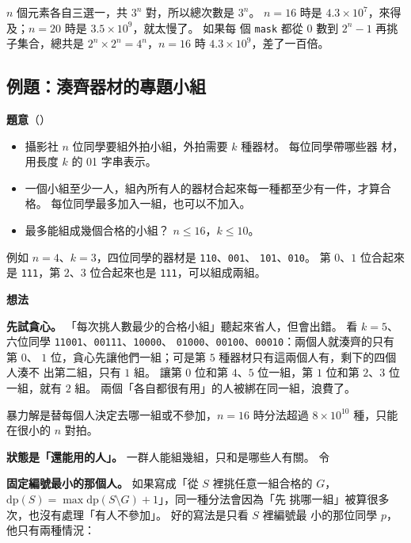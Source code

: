 $n$ 個元素各自三選一，共 $3^n$ 對，所以總次數是 $3^n$。 $n = 16$ 時是
$4.3 \times 10^7$，來得及；$n = 20$ 時是 $3.5 \times 10^9$，就太慢了。 如果每
個 \texttt{mask} 都從 $0$ 數到 $2^n - 1$ 再挑子集合，總共是
$2^n \times 2^n = 4^n$，$n = 16$ 時 $4.3 \times 10^9$，差了一百倍。

\subsection{例題：湊齊器材的專題小組}
\label{sec:ex-bm-kit}

\textbf{題意}（）

\begin{itemize}
\item 攝影社 $n$ 位同學要組外拍小組，外拍需要 $k$ 種器材。 每位同學帶哪些器
材，用長度 $k$ 的 01 字串表示。
\item 一個小組至少一人，組內所有人的器材合起來每一種都至少有一件，才算合格。
每位同學最多加入一組，也可以不加入。
\item 最多能組成幾個合格的小組？ $n \le 16$，$k \le 10$。
\end{itemize}

例如 $n = 4$、$k = 3$，四位同學的器材是 \texttt{110}、\texttt{001}、
\texttt{101}、\texttt{010}。 第 $0$、$1$ 位合起來是 \texttt{111}，第 $2$、$3$
位合起來也是 \texttt{111}，可以組成兩組。

\textbf{想法}

\textbf{先試貪心。} 「每次挑人數最少的合格小組」聽起來省人，但會出錯。 看
$k = 5$、六位同學 \texttt{11001}、\texttt{00111}、\texttt{10000}、
\texttt{01000}、\texttt{00100}、\texttt{00010}：兩個人就湊齊的只有第 $0$、
$1$ 位，貪心先讓他們一組；可是第 $5$ 種器材只有這兩個人有，剩下的四個人湊不
出第二組，只有 $1$ 組。 讓第 $0$ 位和第 $4$、$5$ 位一組，第 $1$ 位和第
$2$、$3$ 位一組，就有 $2$ 組。 兩個「各自都很有用」的人被綁在同一組，浪費了。

暴力解是替每個人決定去哪一組或不參加，$n = 16$ 時分法超過 $8 \times 10^{10}$
種，只能在很小的 $n$ 對拍。

\textbf{狀態是「還能用的人」。} 一群人能組幾組，只和是哪些人有關。 令

\begin{center}
\end{center}

\textbf{固定編號最小的那個人。} 如果寫成「從 $S$ 裡挑任意一組合格的 $G$，
$\mathrm{dp}(S) = \max \mathrm{dp}(S \setminus G) + 1$」，同一種分法會因為「先
挑哪一組」被算很多次，也沒有處理「有人不參加」。 好的寫法是只看 $S$ 裡編號最
小的那位同學 $p$，他只有兩種情況：

